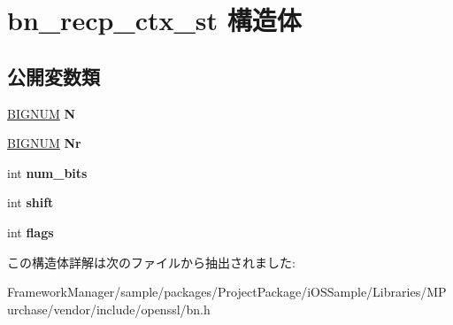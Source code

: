 \hypertarget{structbn__recp__ctx__st}{}\section{bn\+\_\+recp\+\_\+ctx\+\_\+st 構造体}
\label{structbn__recp__ctx__st}
\subsection*{公開変数類}
\begin{DoxyCompactItemize}
\item 
\hypertarget{structbn__recp__ctx__st_ab52e6e895e525fba79d3a18ef2b3dcb8}{}\hyperlink{structbignum__st}{B\+I\+G\+N\+U\+M} {\bfseries N}\label{structbn__recp__ctx__st_ab52e6e895e525fba79d3a18ef2b3dcb8}

\item 
\hypertarget{structbn__recp__ctx__st_a2e7a01e3de39b7998cd21792a0b87565}{}\hyperlink{structbignum__st}{B\+I\+G\+N\+U\+M} {\bfseries Nr}\label{structbn__recp__ctx__st_a2e7a01e3de39b7998cd21792a0b87565}

\item 
\hypertarget{structbn__recp__ctx__st_a685ffc37ed182cdebd42f2382f552cab}{}int {\bfseries num\+\_\+bits}\label{structbn__recp__ctx__st_a685ffc37ed182cdebd42f2382f552cab}

\item 
\hypertarget{structbn__recp__ctx__st_ac74357f903a13ec4404d8e0a2d752ec7}{}int {\bfseries shift}\label{structbn__recp__ctx__st_ac74357f903a13ec4404d8e0a2d752ec7}

\item 
\hypertarget{structbn__recp__ctx__st_acc82125c857d066e9f20f779d0a2ba3e}{}int {\bfseries flags}\label{structbn__recp__ctx__st_acc82125c857d066e9f20f779d0a2ba3e}

\end{DoxyCompactItemize}


この構造体詳解は次のファイルから抽出されました\+:\begin{DoxyCompactItemize}
\item 
Framework\+Manager/sample/packages/\+Project\+Package/i\+O\+S\+Sample/\+Libraries/\+M\+Purchase/vendor/include/openssl/bn.\+h\end{DoxyCompactItemize}

